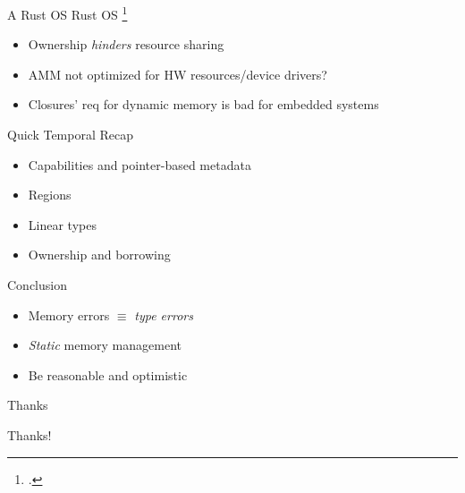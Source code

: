 \documentclass[aspectratio=169]{beamer}
\begin{document}
\begin{frame}{A Rust OS}
Rust OS \footcite{levy_ownership_2015}
    \begin{itemize}
        \item Ownership \emph{hinders} resource sharing
        \item AMM not optimized for HW resources/device drivers?
        \item Closures' req for dynamic memory is bad for embedded systems
    \end{itemize}
\end{frame}

\begin{frame}{Quick Temporal Recap}
    \begin{itemize}
      \item Capabilities and pointer-based metadata 
      \item Regions 
      \item Linear types 
      \item Ownership and borrowing 
    \end{itemize}
\end{frame}

\begin{frame}{Conclusion}
    \begin{itemize}[<+->]
        \item Memory errors $\equiv$ \emph{type errors}
        \item \emph{Static} memory management %
        \item Be reasonable and optimistic %
    \end{itemize}
\end{frame}

\begin{frame}{Thanks}
    \begin{center}
        \Huge{Thanks!}
    \end{center}
\end{frame}
\end{document}
